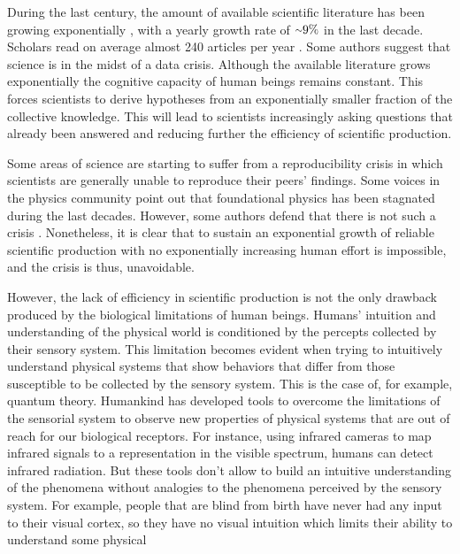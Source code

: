 \documentclass[11pt,a4paper,twoside]{report}
\newcommand{\+}{\textnormal{+} }
\theoremstyle{definition}
\numberwithin{equation}{chapter}
\begin{document}
During the last century, the amount of available scientific literature has been
growing exponentially \cite{sinatra2015century,BornmannRudiger}, with a yearly
growth rate of $ {\raise.17ex\hbox{$\scriptstyle\mathtt{\sim}$}} 9\%$ in the
last decade. Scholars read on average almost 240 articles per year
\cite{publications7010018}. Some authors \cite{Alkhateeb} suggest that science
is in the midst of a data crisis. Although the available literature grows
exponentially the cognitive capacity of human beings remains constant. This
forces scientists to derive hypotheses from an exponentially smaller fraction of
the collective knowledge. This will lead to scientists increasingly asking
questions that already been answered and reducing further the efficiency of
scientific production. 

Some areas of science are starting to suffer from a reproducibility crisis
\cite{Saltelli, begley2012raise} in which scientists are generally unable to
reproduce their peers' findings. Some voices in the physics community
\cite{Sabine} point out that foundational physics has been stagnated during the
last decades. However, some authors defend that there is not such a crisis
\cite{Fanelli2628}. Nonetheless, it is clear that to sustain an exponential
growth of reliable scientific production with no exponentially increasing human
effort is impossible, and the crisis is thus, unavoidable.
 \par
However, the lack of efficiency in scientific production is not the only
drawback produced by the biological limitations of human beings. Humans'
intuition and understanding of the physical world is conditioned by the percepts
collected by their sensory system. This limitation becomes evident when trying
to intuitively understand physical systems that show behaviors that differ from
those susceptible to be collected by the sensory system. This is the case of,
for example, quantum theory. Humankind has developed tools to overcome the
limitations of the sensorial system to observe new properties of physical
systems that are out of reach for our biological receptors. For instance, using
infrared cameras to map infrared signals to a representation in the visible
spectrum, humans can detect infrared radiation. But these tools don't allow to
build an intuitive understanding of the phenomena without analogies to the
phenomena perceived by the sensory system. For example, people that are blind
from birth have never had any input to their visual cortex, so they have no
visual intuition which limits their ability to understand some physical
\end{document}
